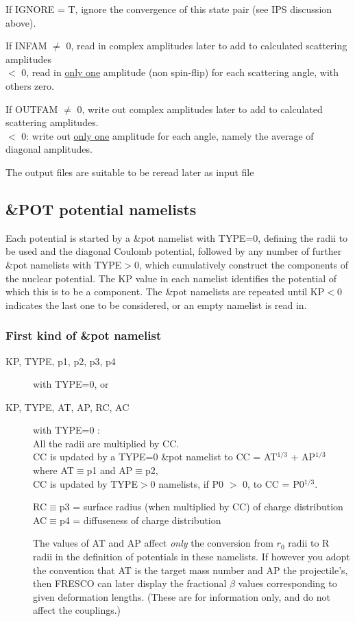 \documentclass[11pt]{article}
\begin{document}
\begin{description}
If IGNORE = T, ignore the convergence of this  state pair
(see IPS discussion above).

If INFAM $\ne$ 0,  read in complex amplitudes later to add to
calculated scattering amplitudes\\
$<$ 0, read in \underline{only one} amplitude (non spin-flip)
for each scattering angle, with others zero.

If OUTFAM $\ne$ 0,  write out complex amplitudes later to add to
calculated scattering amplitudes.\\
$<$ 0: write out \underline{only one} amplitude 
for each  angle, namely the average of diagonal amplitudes.


The output files are suitable to be reread later as input file
\end{description}

\newpage
\subsection{\&POT potential namelists}
%
Each potential is started by a \&pot namelist with TYPE=0, defining the radii to be used
and the diagonal Coulomb potential, followed by any number of further \&pot namelists with TYPE$>$0,
which cumulatively construct the components of the nuclear potential.
The KP value in each namelist identifies the potential of which this is to be a component.
The \&pot namelists are repeated until KP$<0$ indicates the last one to be considered, or an empty namelist is read in.


\subsubsection{First kind of \&pot namelist}

\begin{description}
\item[KP, TYPE,  p1, p2, p3, p4]  with TYPE=0, or 
\item[KP, TYPE,  AT, AP,  RC, AC] with TYPE=0 : \\
%
    All the radii are multiplied by CC. \\
       CC is updated by a TYPE=0 \&pot namelist to CC = AT$^{1/3}$ + AP$^{1/3}$ where AT$\equiv$p1 and AP$\equiv$p2, \\
       CC is updated by TYPE$>$0 namelists, if P0 $>$ 0,  to CC = P0$^{1/3}$.

RC$\equiv$p3 = surface radius (when multiplied by CC) of charge distribution\\
AC$\equiv$p4  = diffuseness of charge distribution



The values of AT and AP affect {\em only} the conversion from $r_0$ radii
to R radii in the definition of potentials in these namelists.
If however you adopt the convention that AT is the target mass number
and AP the projectile's, then FRESCO can later display the
fractional $\beta$ values corresponding to given deformation lengths.
(These are for information only, and do not affect the couplings.)


\end{description}
\end{document}
